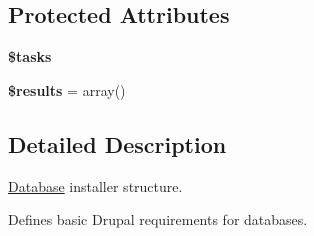 \subsection*{Protected Attributes}
\begin{DoxyCompactItemize}
\item 
\hypertarget{classDatabaseTasks_abe98e1901f232f60a8690b0af4b2b8ab}{
{\bfseries \$tasks}}
\label{classDatabaseTasks_abe98e1901f232f60a8690b0af4b2b8ab}

\item 
\hypertarget{classDatabaseTasks_ac218754419e471c1523a4e56d36899dc}{
{\bfseries \$results} = array()}
\label{classDatabaseTasks_ac218754419e471c1523a4e56d36899dc}

\end{DoxyCompactItemize}


\subsection{Detailed Description}
\hyperlink{classDatabase}{Database} installer structure.

Defines basic Drupal requirements for databases. 


